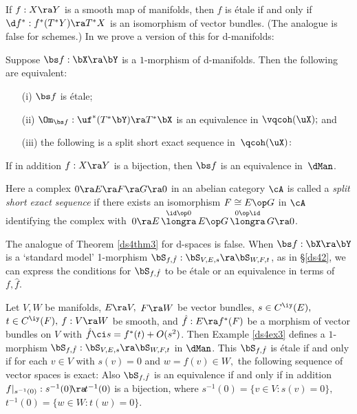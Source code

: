 \documentclass{article}
\begin{document}
If $f:X\ra Y$ is
a smooth map of manifolds, then $f$ is \'etale if and only if $\d
f^*:f^*(T^*Y)\ra T^*X$ is an isomorphism of vector bundles. (The
analogue is false for schemes.) In \cite[\S 3.5]{Joyc6} we prove a
version of this for d-manifolds:

\begin{thm} Suppose $\bs f:\bX\ra\bY$ is a $1$-morphism of
d-manifolds. Then the following are equivalent:
\begin{itemize}
\setlength{\itemsep}{0pt}
\setlength{\parsep}{0pt}
\item[{\rm(i)}] $\bs f$ is \'etale;
\item[{\rm(ii)}] $\Om_{\bs f}:\uf^*(T^*\bY)\ra T^*\bX$ is an
equivalence in $\vqcoh(\uX);$ and
\item[{\rm(iii)}] the following is a split short
exact sequence in\/~$\qcoh(\uX)\!:$
\end{itemize}
\e
{}
\label{ds4eq3}
\e
If in addition $f:X\ra Y$ is a bijection, then $\bs f$ is an
equivalence in\/~$\dMan$.
\label{ds4thm3}
\end{thm}

Here a complex $0\ra E\ra F\ra G\ra 0$ in an abelian category $\cA$
is called a {\it split short exact sequence\/} if there exists an
isomorphism $F\cong E\op G$ in $\cA$ identifying the complex
with~$0\ra E \,{\buildrel \id\op 0\over\longra}\, E\op G\,{\buildrel
0\op \id\over\longra}\,G\ra 0$.

The analogue of Theorem \ref{ds4thm3} for d-spaces is false. When
$\bs f:\bX\ra\bY$ is a `standard model' 1-morphism
$\bS_{\smash{f,\hat f}}:\bS_{V,E,s}\ra\bS_{W,F,t}$, as in
\S\ref{ds42}, we can express the conditions for $\bS_{\smash{f,\hat
f}}$ to be \'etale or an equivalence in terms of~$f,\hat
f$.

\begin{thm} Let\/ $V,W$ be manifolds, $E\ra V,$ $F\ra W$ be vector
bundles, $s\in C^\iy(E),$ $t\in C^\iy(F),$ $f:V\ra W$ be smooth,
and\/ $\hat f:E\ra f^*(F)$ be a morphism of vector bundles on $V$
with\/ $\hat f\ci s= f^*(t)+O(s^2)$. Then Example\/
{\rm\ref{ds4ex3}} defines a $1$-morphism\/ $\bS_{\smash{f,\hat
f}}:\bS_{V,E,s}\ra\bS_{W,F,t}$ in $\dMan$. This $\bS_{\smash{f,\hat
f}}$ is \'etale if and only if for each\/ $v\in V$ with\/ $s(v)=0$
and\/ $w=f(v)\in W,$ the following sequence of vector spaces is
exact:
\e
{}
\label{ds4eq4}
\e
Also $\bS_{\smash{f,\hat f}}$ is an equivalence if and only if in
addition\/ $f\vert_{s^{-1}(0)}:s^{-1}(0)\!\ra\! t^{-1}(0)$ is a
bijection, where $s^{-1}(0)\!=\!\{v\in V:s(v)\!=\!0\},$
$t^{-1}(0)\!=\!\{w\in W:t(w)\!=\!0\}$.
\label{ds4thm4}
\end{thm}
\end{document}
